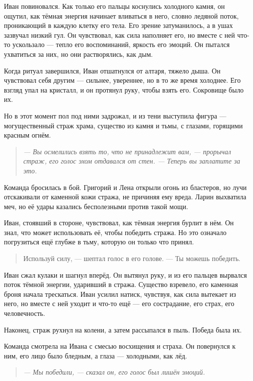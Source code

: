 \documentclass[12pt,a4paper]{book}
\newenvironment{dialogue}{\begin{quote}\itshape}{\end{quote}}
\begin{document}
Иван повиновался. Как только его пальцы коснулись холодного камня, он ощутил, как тёмная энергия начинает вливаться в него, словно ледяной поток, проникающий в каждую клетку его тела. Его зрение затуманилось, а в ушах зазвучал низкий гул. Он чувствовал, как сила наполняет его, но вместе с ней что-то ускользало --- тепло его воспоминаний, яркость его эмоций. Он пытался ухватиться за них, но они растворялись, как дым.

Когда ритуал завершился, Иван отшатнулся от алтаря, тяжело дыша. Он чувствовал себя другим --- сильнее, увереннее, но в то же время холоднее. Его взгляд упал на кристалл, и он протянул руку, чтобы взять его. Сокровище было их.

Но в этот момент пол под ними задрожал, и из тени выступила фигура --- могущественный страж храма, существо из камня и тьмы, с глазами, горящими красным огнём.

\begin{dialogue}
--- Вы осмелились взять то, что не принадлежит вам, --- прорычал страж, его голос эхом отдавался от стен. --- Теперь вы заплатите за это.
\end{dialogue}

Команда бросилась в бой. Григорий и Лена открыли огонь из бластеров, но лучи отскакивали от каменной кожи стража, не причиняя ему вреда. Ларин выхватила меч, но её удары казались бесполезными против такой мощи.

Иван, стоявший в стороне, чувствовал, как тёмная энергия бурлит в нём. Он знал, что может использовать её, чтобы победить стража. Но это означало погрузиться ещё глубже в тьму, которую он только что принял.

\begin{quote}
Используй силу, --- шептал голос в его голове. --- Ты можешь победить.
\end{quote}

Иван сжал кулаки и шагнул вперёд. Он вытянул руку, и из его пальцев вырвался поток тёмной энергии, ударивший в стража. Существо взревело, его каменная броня начала трескаться. Иван усилил натиск, чувствуя, как сила вытекает из него, но вместе с ней уходит и что-то ещё --- его сострадание, его страх, его человечность.

Наконец, страж рухнул на колени, а затем рассыпался в пыль. Победа была их.

Команда смотрела на Ивана с смесью восхищения и страха. Он повернулся к ним, его лицо было бледным, а глаза --- холодными, как лёд.

\begin{dialogue}
--- Мы победили, --- сказал он, его голос был лишён эмоций.
\end{dialogue}
\end{document}
